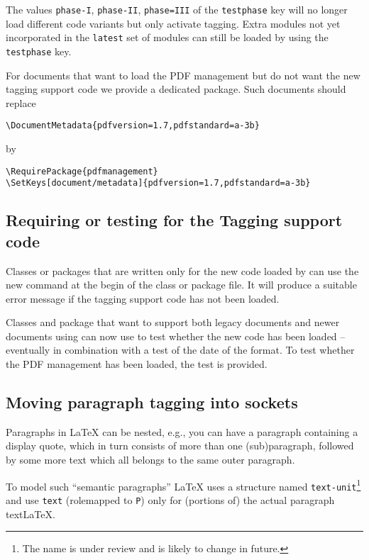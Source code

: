 \documentclass{ltnews}
\begin{document}
The values \texttt{phase-I}, \texttt{phase-II}, \texttt{phase=III} of the
\texttt{testphase} key will no longer load different code variants but only
activate tagging. Extra modules not yet incorporated in the \texttt{latest} set of
modules can still be loaded by using  the \texttt{testphase} key.

For documents that want to load the PDF management but do not want the new tagging support
code we provide a dedicated package. Such documents should replace
\begin{verbatim}
\DocumentMetadata{pdfversion=1.7,pdfstandard=a-3b}
\end{verbatim}
by
\begin{verbatim}
\RequirePackage{pdfmanagement}
\SetKeys[document/metadata]{pdfversion=1.7,pdfstandard=a-3b}
\end{verbatim}


\subsection{Requiring or testing for the Tagging support code}
Classes or packages that are written only for the new code loaded by
 can use the new command  at the begin
of the class or package file. It will produce a suitable error message if
the tagging support code has not been loaded.

Classes and package that want to support both legacy documents and newer documents
using  can now use  to test whether the
new code has been loaded -- eventually in combination with a test of the date of
the format. To test whether the PDF management has been loaded, the test
 is provided.

 
\subsection{Moving paragraph tagging into sockets}

Paragraphs in \LaTeX{} can be nested, e.g., you can have a paragraph
containing a display quote, which in turn consists of more than one
(sub)paragraph, followed by some more text which all belongs to the
same outer paragraph.

To model such \enquote{semantic paragraphs} \LaTeX{} uses a structure named 
\texttt{text-unit}\footnote{The name is under review and is likely to change in future.}
and use \texttt{text} (rolemapped to \texttt{P}) only for (portions of) 
the actual paragraph text\LaTeX{}. 
\end{document}
